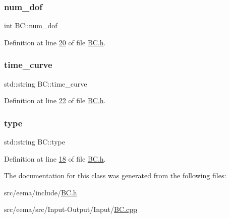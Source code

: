 \mbox{\label{class_b_c_a71fe2e36793286c4e683a3d8485abaf2}} 
\subsubsection{\texorpdfstring{num\+\_\+dof}{num\_dof}}
{\footnotesize\ttfamily int B\+C\+::num\+\_\+dof\hspace{0.3cm}{\ttfamily [private]}}



Definition at line \hyperlink{_b_c_8h_source_l00020}{20} of file \hyperlink{_b_c_8h_source}{B\+C.\+h}.

\mbox{\label{class_b_c_a84f989feaa5e81214f17b6dbdd1cf2ab}} 
\subsubsection{\texorpdfstring{time\+\_\+curve}{time\_curve}}
{\footnotesize\ttfamily std\+::string B\+C\+::time\+\_\+curve\hspace{0.3cm}{\ttfamily [private]}}



Definition at line \hyperlink{_b_c_8h_source_l00022}{22} of file \hyperlink{_b_c_8h_source}{B\+C.\+h}.

\mbox{\label{class_b_c_ab25297125dceec52f445a3a5efa77784}} 
\subsubsection{\texorpdfstring{type}{type}}
{\footnotesize\ttfamily std\+::string B\+C\+::type\hspace{0.3cm}{\ttfamily [private]}}



Definition at line \hyperlink{_b_c_8h_source_l00018}{18} of file \hyperlink{_b_c_8h_source}{B\+C.\+h}.



The documentation for this class was generated from the following files\+:\begin{DoxyCompactItemize}
\item 
src/eema/include/\hyperlink{_b_c_8h}{B\+C.\+h}\item 
src/eema/src/\+Input-\/\+Output/\+Input/\hyperlink{_b_c_8cpp}{B\+C.\+cpp}\end{DoxyCompactItemize}
